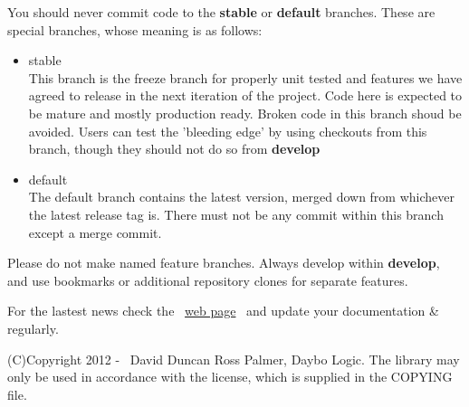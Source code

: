 \documentclass{article}
\begin{document}
You should never commit code to the \textbf{stable} or \textbf{default} branches.  These are special
branches, whose meaning is as follows:

\begin{itemize}
\item stable
\\
This branch is the freeze branch for properly unit tested and features we have agreed to release in
the next iteration of the project.  Code here is expected to be mature and mostly production ready.
Broken code in this branch shoud be avoided.  Users can test the 'bleeding edge' by using checkouts
from this branch, though they should not do so from \textbf{develop}
\item default
\\
The default branch contains the latest version, merged down from whichever the latest release tag is.
There must not be any commit within this branch except a merge commit.
\\
\end{itemize}
Please do not make named feature branches.  Always develop within \textbf{develop}, and use bookmarks
or additional repository clones for separate features.

\par For the lastest news check the~ \href{http://bitbucket.org/daybologic/dlpodget}{web
page}~ and update your documentation \& regularly.


\par (C)Copyright 2012 -
\the\year
~David Duncan Ross Palmer, Daybo Logic. The library may only be used in accordance
with
the license, which is supplied in the COPYING file.\\
\end{document}

